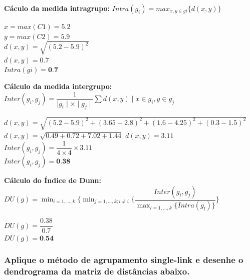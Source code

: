 \documentclass{article}
\begin{document}
  \textbf{Cáculo da medida intragrupo:} 
  $Intra(g_i) = max_{x,y \in gi} \{d(x,y)\} $

  \begin{center}
    $x = max(C1) = 5.2$ \\
    $y = max(C2) = 5.9$ \\
    $d(x,y) = \sqrt{(5.2-5.9)^2}  $ \\
    $d(x,y) = 0.7$ \\
    $ Intra(gi) = \textbf{0.7} $
  \end{center}

  \textbf{Cálculo da medida intergrupo:}
  $Inter(g_i, g_j) = \dfrac{1}{{\mid g_i \mid \times \mid g_j \mid}} \sum d(x,y) \mid x \in g_i, y \in g_j$ \\

  \begin{center}
    $d(x,y) = \sqrt{(5.2 - 5.9)^2 + (3.65 - 2.8)^2 + (1.6 - 4.25)^2 + (0.3 - 1.5)^2}$ \\
    $d(x,y) = \sqrt{0.49 + 0.72 + 7.02 + 1.44}$
    $d(x,y) = 3.11$
    $Inter(g_i, g_j) = \dfrac{1}{4 \times 4} \times 3.11$ \\
    $Inter(g_i, g_j) = \textbf{0.38} $
  \end{center}

  
  \textbf{Cálculo do Índice de Dunn:} 
  $DU(g) = \min_{i=1, ...,k} \Bigg\{ \min_{j=1, ..., k; i \neq i} \Bigg\{ \dfrac{Inter(g_i,g_j)}{\max_{l=1, ..., k} \big\{ Intra(g_l) \big\}} \Bigg\}$ \\

  \begin{center}
    $DU(g) = \dfrac{0.38}{0.7}$ \\
    $DU(g) = \textbf{0.54}$    
  \end{center}
  
  \subsubsection{Aplique o método de agrupamento single-link e desenhe o dendrograma da matriz de distâncias abaixo.}
\end{document}
